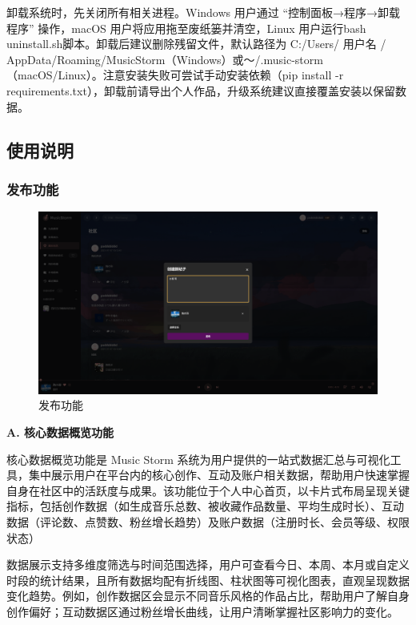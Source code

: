 \documentclass{base}
\numberwithin{figure}{section} %
\begin{document}
卸载系统时，先关闭所有相关进程。Windows 用户通过 “控制面板→程序→卸载程序” 操作，macOS 用户将应用拖至废纸篓并清空，Linux 用户运行bash uninstall.sh脚本。卸载后建议删除残留文件，默认路径为 C:/Users/ 用户名 / AppData/Roaming/MusicStorm（Windows）或～/.music-storm（macOS/Linux）。注意安装失败可尝试手动安装依赖（pip install -r requirements.txt），卸载前请导出个人作品，升级系统建议直接覆盖安装以保留数据。

\subsection{使用说明}

\subsubsection{发布功能}

\begin{figure}[H]
    \centering
    \includegraphics[width=\textwidth]{images/7-1.png}
    \caption{发布功能}
    \label{fig:post}
\end{figure}

\textbf{A. 核心数据概览功能}

核心数据概览功能是 Music Storm 系统为用户提供的一站式数据汇总与可视化工具，集中展示用户在平台内的核心创作、互动及账户相关数据，帮助用户快速掌握自身在社区中的活跃度与成果。该功能位于个人中心首页，以卡片式布局呈现关键指标，包括创作数据（如生成音乐总数、被收藏作品数量、平均生成时长）、互动数据（评论数、点赞数、粉丝增长趋势）及账户数据（注册时长、会员等级、权限状态）

数据展示支持多维度筛选与时间范围选择，用户可查看今日、本周、本月或自定义时段的统计结果，且所有数据均配有折线图、柱状图等可视化图表，直观呈现数据变化趋势。例如，创作数据区会显示不同音乐风格的作品占比，帮助用户了解自身创作偏好；互动数据区通过粉丝增长曲线，让用户清晰掌握社区影响力的变化。
\end{document}
